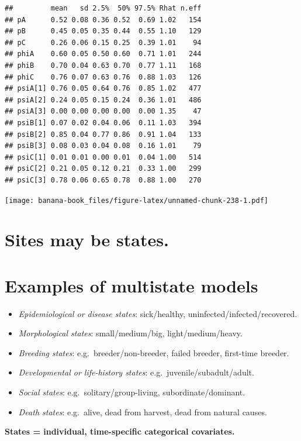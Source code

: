 \documentclass[
  12pt,
]{krantz}
\begin{document}
\begin{verbatim}
##         mean   sd 2.5%  50% 97.5% Rhat n.eff
## pA      0.52 0.08 0.36 0.52  0.69 1.02   154
## pB      0.45 0.05 0.35 0.44  0.55 1.10   129
## pC      0.26 0.06 0.15 0.25  0.39 1.01    94
## phiA    0.60 0.05 0.50 0.60  0.71 1.01   244
## phiB    0.70 0.04 0.63 0.70  0.77 1.11   168
## phiC    0.76 0.07 0.63 0.76  0.88 1.03   126
## psiA[1] 0.76 0.05 0.64 0.76  0.85 1.02   477
## psiA[2] 0.24 0.05 0.15 0.24  0.36 1.01   486
## psiA[3] 0.00 0.00 0.00 0.00  0.00 1.35    47
## psiB[1] 0.07 0.02 0.04 0.06  0.11 1.03   394
## psiB[2] 0.85 0.04 0.77 0.86  0.91 1.04   133
## psiB[3] 0.08 0.03 0.04 0.08  0.16 1.01    79
## psiC[1] 0.01 0.01 0.00 0.01  0.04 1.00   514
## psiC[2] 0.21 0.05 0.12 0.21  0.33 1.00   299
## psiC[3] 0.78 0.06 0.65 0.78  0.88 1.00   270
\end{verbatim}

\texttt{[image: banana-book\_files/figure-latex/unnamed-chunk-238-1.pdf]}

\hypertarget{sites-may-be-states.}{%
\section{Sites may be states.}\label{sites-may-be-states.}}

\hypertarget{examples-of-multistate-models}{%
\section{Examples of multistate models}\label{examples-of-multistate-models}}

\begin{itemize}
\item
  \emph{Epidemiological or disease states}: sick/healthy, uninfected/infected/recovered.
\item
  \emph{Morphological states}: small/medium/big, light/medium/heavy.
\item
  \emph{Breeding states}: e.g.~breeder/non-breeder, failed breeder, first-time breeder.
\item
  \emph{Developmental or life-history states}: e.g.~juvenile/subadult/adult.
\item
  \emph{Social states}: e.g.~solitary/group-living, subordinate/dominant.
\item
  \emph{Death states}: e.g.~alive, dead from harvest, dead from natural causes.
\end{itemize}

\textbf{States = individual, time-specific categorical covariates.}
\end{document}
